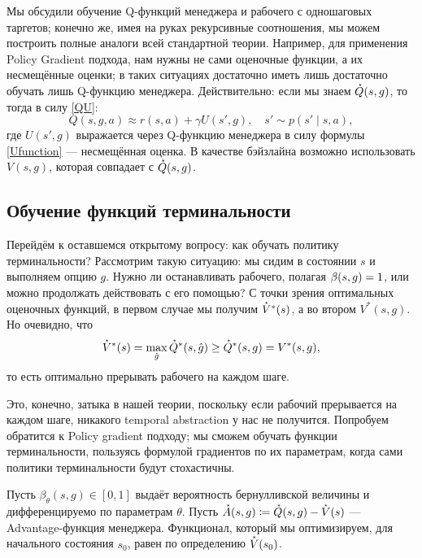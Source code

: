 Мы обсудили обучение Q-функций менеджера и рабочего с одношаговых таргетов; конечно же, имея на руках рекурсивные соотношения, мы можем построить полные аналоги всей стандартной теории. Например, для применения Policy Gradient подхода, нам нужны не сами оценочные функции, а их несмещённые оценки; в таких ситуациях достаточно иметь лишь достаточно обучать лишь Q-функцию менеджера. Действительно: если мы знаем $\accentset{\star}{Q}(s, g)$, то тогда в силу \eqref{QU}:
$$Q(s, g, a) \approx r(s, a) + \gamma U(s', g), \quad s' \sim p(s' \mid s, a),$$
где $U(s', g)$ выражается через Q-функцию менеджера в силу формулы \eqref{Ufunction} --- несмещённая оценка. В качестве бэйзлайна возможно использовать $V(s, g)$, которая совпадает с $\accentset{\star}{Q}(s, g)$.

\subsection{Обучение функций терминальности}

Перейдём к оставшемся открытому вопросу: как обучать политику терминальности? Рассмотрим такую ситуацию: мы сидим в состоянии $s$ и выполняем опцию $g$. Нужно ли останавливать рабочего, полагая $\beta(s, g) \HM= 1$, или можно продолжать действовать с его помощью? С точки зрения оптимальных оценочных функций, в первом случае мы получим $\accentset{\star}{V}^*(s)$, а во втором $V^*(s, g)$. Но очевидно, что
$$\accentset{\star}{V}^*(s) = \max_{\hat{g}} \accentset{\star}{Q}^*(s, \hat{g}) \ge \accentset{\star}{Q}^*(s, g) = V^*(s, g),$$
то есть оптимально прерывать рабочего на каждом шаге.

Это, конечно, затыка в нашей теории, поскольку если рабочий прерывается на каждом шаге, никакого temporal abstraction у нас не получится. Попробуем обратится к Policy gradient подходу; мы сможем обучать функции терминальности, пользуясь формулой градиентов по их параметрам, когда сами политики терминальности будут стохастичны. 

Пусть $\beta_{\theta}(s, g) \in [0, 1]$ выдаёт вероятность бернулливской величины и дифференцируемо по параметрам $\theta$. Пусть $\manager{A}(s, g) \coloneqq \manager{Q}(s, g) \HM- \manager{V}(s)$ --- Advantage-функция менеджера. Функционал, который мы оптимизируем, для начального состояния $s_0$, равен по определению $\accentset{\star}{V}(s_0)$.


